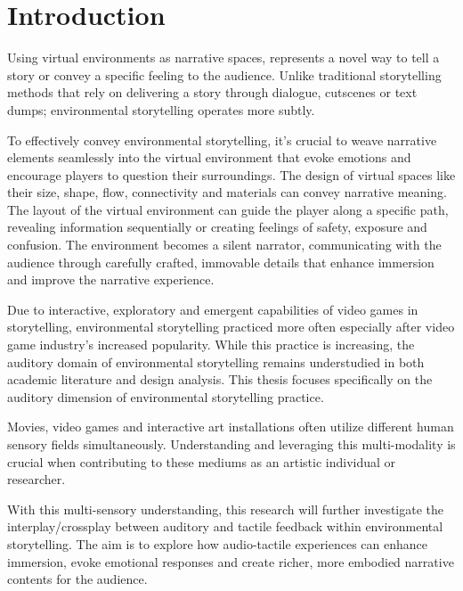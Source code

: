 \chapter{Introduction}
Using virtual environments as narrative spaces, represents a novel way to tell a story or convey a specific feeling to the audience. Unlike traditional storytelling methods that rely on delivering a story through dialogue, cutscenes or text dumps; environmental storytelling operates more subtly.\par

To effectively convey environmental storytelling, it’s crucial to weave narrative elements seamlessly into the virtual environment that evoke emotions and encourage players to question their surroundings. The design of virtual spaces like their size, shape, flow, connectivity and materials can convey narrative meaning. The layout of the virtual environment can guide the player along a specific path, revealing information sequentially or creating feelings of safety, exposure and confusion. The environment becomes a silent narrator, communicating with the audience through carefully crafted, immovable details that enhance immersion and improve the narrative experience\cite{Environmental_Storytelling_Blogpost}.\par

Due to interactive, exploratory and emergent capabilities of video games in storytelling, environmental storytelling practiced more often especially after video game industry's increased popularity\cite{Video_Game_Industry_Stat}. While this practice is increasing, the auditory domain of environmental storytelling remains understudied in both academic literature and design analysis\cite{Archaeological_Gameworld}. This thesis focuses specifically on the auditory dimension of environmental storytelling practice.\par

Movies, video games and interactive art installations often utilize different human sensory fields simultaneously. Understanding and leveraging this multi-modality is crucial when contributing to these mediums as an artistic individual or researcher.\par

With this multi-sensory understanding, this research will further investigate the interplay/crossplay between auditory and tactile feedback within environmental storytelling. The aim is to explore how audio-tactile experiences can enhance immersion, evoke emotional responses and create richer, more embodied narrative contents for the audience.\par
